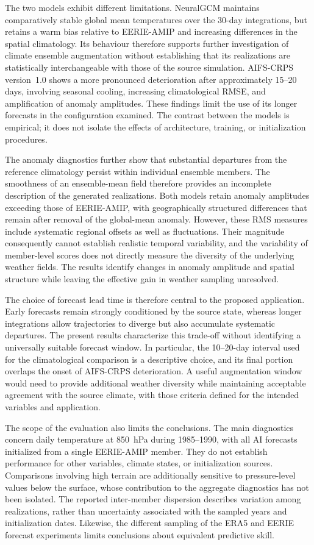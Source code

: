 The two models exhibit different limitations. NeuralGCM maintains comparatively stable global mean temperatures over the 30-day integrations, but retains a warm bias relative to EERIE-AMIP and increasing differences in the spatial climatology. Its behaviour therefore supports further investigation of climate ensemble augmentation without establishing that its realizations are statistically interchangeable with those of the source simulation. AIFS-CRPS version~1.0 shows a more pronounced deterioration after approximately 15--20 days, involving seasonal cooling, increasing climatological RMSE, and amplification of anomaly amplitudes. These findings limit the use of its longer forecasts in the configuration examined. The contrast between the models is empirical; it does not isolate the effects of architecture, training, or initialization procedures.

The anomaly diagnostics further show that substantial departures from the reference climatology persist within individual ensemble members. The smoothness of an ensemble-mean field therefore provides an incomplete description of the generated realizations. Both models retain anomaly amplitudes exceeding those of EERIE-AMIP, with geographically structured differences that remain after removal of the global-mean anomaly. However, these RMS measures include systematic regional offsets as well as fluctuations. Their magnitude consequently cannot establish realistic temporal variability, and the variability of member-level scores does not directly measure the diversity of the underlying weather fields. The results identify changes in anomaly amplitude and spatial structure while leaving the effective gain in weather sampling unresolved.

The choice of forecast lead time is therefore central to the proposed application. Early forecasts remain strongly conditioned by the source state, whereas longer integrations allow trajectories to diverge but also accumulate systematic departures. The present results characterize this trade-off without identifying a universally suitable forecast window. In particular, the 10--20-day interval used for the climatological comparison is a descriptive choice, and its final portion overlaps the onset of AIFS-CRPS deterioration. A useful augmentation window would need to provide additional weather diversity while maintaining acceptable agreement with the source climate, with those criteria defined for the intended variables and application.

The scope of the evaluation also limits the conclusions. The main diagnostics concern daily temperature at 850~hPa during 1985--1990, with all AI forecasts initialized from a single EERIE-AMIP member. They do not establish performance for other variables, climate states, or initialization sources. Comparisons involving high terrain are additionally sensitive to pressure-level values below the surface, whose contribution to the aggregate diagnostics has not been isolated. The reported inter-member dispersion describes variation among realizations, rather than uncertainty associated with the sampled years and initialization dates. Likewise, the different sampling of the ERA5 and EERIE forecast experiments limits conclusions about equivalent predictive skill.

